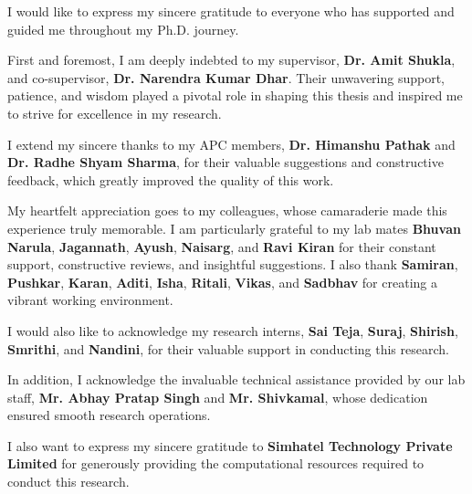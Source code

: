 %
\begin{Acknowledgements}	

I would like to express my sincere gratitude to everyone who has supported and guided me throughout my Ph.D. journey.

First and foremost, I am deeply indebted to my supervisor, \textbf{Dr. Amit Shukla}, and co-supervisor, \textbf{Dr. Narendra Kumar Dhar}. Their unwavering support, patience, and wisdom played a pivotal role in shaping this thesis and inspired me to strive for excellence in my research.

I extend my sincere thanks to my APC members, \textbf{Dr. Himanshu Pathak} and \textbf{Dr. Radhe Shyam Sharma}, for their valuable suggestions and constructive feedback, which greatly improved the quality of this work.

My heartfelt appreciation goes to my colleagues, whose camaraderie made this experience truly memorable. I am particularly grateful to my lab mates \textbf{Bhuvan Narula}, \textbf{Jagannath}, \textbf{Ayush}, \textbf{Naisarg}, and \textbf{Ravi Kiran} for their constant support, constructive reviews, and insightful suggestions. I also thank \textbf{Samiran}, \textbf{Pushkar}, \textbf{Karan}, \textbf{Aditi}, \textbf{Isha}, \textbf{Ritali}, \textbf{Vikas}, and \textbf{Sadbhav} for creating a vibrant working environment.

I would also like to acknowledge my research interns, \textbf{Sai Teja}, \textbf{Suraj}, \textbf{Shirish}, \textbf{Smrithi}, and \textbf{Nandini}, for their valuable support in conducting this research.

In addition, I acknowledge the invaluable technical assistance provided by our lab staff, \textbf{Mr. Abhay Pratap Singh} and \textbf{Mr. Shivkamal}, whose dedication ensured smooth research operations.

I also want to express my sincere gratitude to \textbf{Simhatel Technology Private Limited} for generously providing the computational resources required to conduct this research. 





%
%
\signature[Indian Institute of Technology Mandi]{\today}
\end{Acknowledgements}

